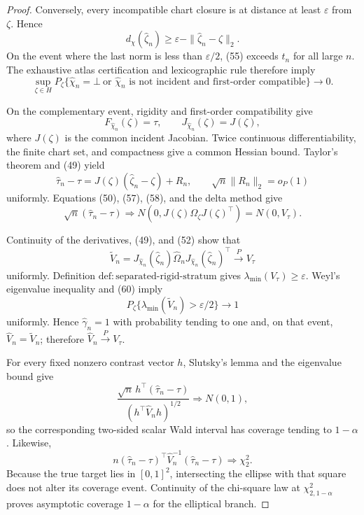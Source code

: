\documentclass{article}
\begin{document}
\begin{proof}
Conversely, every incompatible chart closure is at distance at least \(\varepsilon\) from \(\zeta\).  Hence
\[
 d_{\chi}(\widehat\zeta_n)
 \ge\varepsilon-\|\widehat\zeta_n-\zeta\|_2.           \tag{55}
\]
On the event where the last norm is less than \(\varepsilon/2\), (55) exceeds \(t_n\) for all large \(n\).  The exhaustive atlas certification and lexicographic rule therefore imply
\[
 \sup_{\zeta\in H}P_{\zeta}
 \{\widehat\chi_n=\bot\ \text{or }\widehat\chi_n
   \text{ is not incident and first-order compatible}\}
 \longrightarrow0.                                       \tag{56}
\]

On the complementary event, rigidity and first-order compatibility give
\[
 F_{\widehat\chi_n}(\zeta)=\tau,
 \qquad
 J_{\widehat\chi_n}(\zeta)=J(\zeta),                     \tag{57}
\]
where \(J(\zeta)\) is the common incident Jacobian.  Twice continuous differentiability, the finite chart set, and compactness give a common Hessian bound.  Taylor's theorem and (49) yield
\[
 \widehat\tau_n-\tau
 =J(\zeta)(\widehat\zeta_n-\zeta)+R_n,
 \qquad
 \sqrt n\|R_n\|_2=o_P(1)                                \tag{58}
\]
uniformly.  Equations (50), (57), (58), and the delta method give
\[
 \sqrt n(\widehat\tau_n-\tau)
 \Rightarrow
 N\!\left(0,J(\zeta)\Omega_{\zeta}J(\zeta)^{\top}\right)
 =N(0,V_{\tau}).                                          \tag{59}
\]

Continuity of the derivatives, (49), and (52) show that
\[
 \widetilde V_n=
 J_{\widehat\chi_n}(\widehat\zeta_n)\widehat\Omega_n
 J_{\widehat\chi_n}(\widehat\zeta_n)^{\top}
 \xrightarrow{P}V_{\tau}                                 \tag{60}
\]
uniformly.  Definition \(\mathrm{def{:}separated\text{-}rigid\text{-}stratum}\) gives \(\lambda_{\min}(V_{\tau})\ge\varepsilon\).  Weyl's eigenvalue inequality and (60) imply
\[
 P_{\zeta}\{\lambda_{\min}(\widetilde V_n)>\varepsilon/2\}
 \longrightarrow1                                        \tag{61}
\]
uniformly.  Hence \(\widehat\gamma_n=1\) with probability tending to one and, on that event, \(\widehat V_n=\widetilde V_n\); therefore \(\widehat V_n\xrightarrow{P}V_{\tau}\).

For every fixed nonzero contrast vector \(h\), Slutsky's lemma and the eigenvalue bound give
\[
 \frac{\sqrt n\,h^{\top}(\widehat\tau_n-\tau)}
      {(h^{\top}\widehat V_nh)^{1/2}}
 \Rightarrow N(0,1),                                      \tag{62}
\]
so the corresponding two-sided scalar Wald interval has coverage tending to \(1-\alpha\).  Likewise,
\[
 n(\widehat\tau_n-\tau)^{\top}\widehat V_n^{-1}
   (\widehat\tau_n-\tau)
 \Rightarrow\chi^2_2.                                    \tag{63}
\]
Because the true target lies in \([0,1]^2\), intersecting the ellipse with that square does not alter its coverage event.  Continuity of the chi-square law at \(\chi^2_{2,1-\alpha}\) proves asymptotic coverage \(1-\alpha\) for the elliptical branch.


\end{proof}
\end{document}
